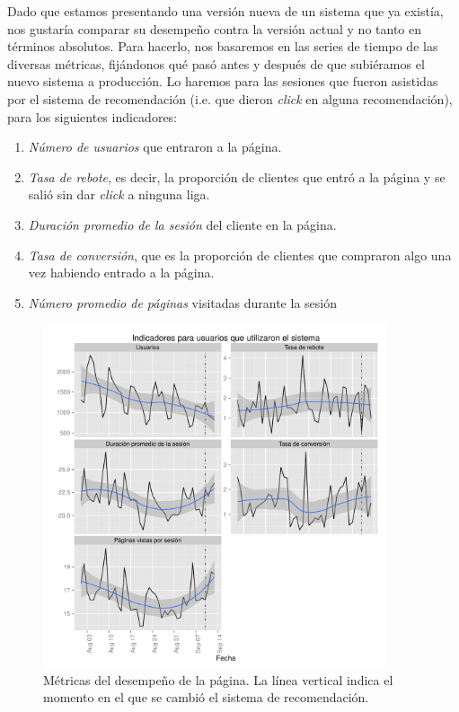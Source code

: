 \documentclass[12pt]{report}
\begin{document}
Dado que estamos presentando una versión nueva de un sistema que ya existía, nos gustaría comparar su desempeño contra la versión actual y no tanto en términos absolutos. Para hacerlo, nos basaremos en las series de tiempo de las diversas métricas, fijándonos qué pasó antes y después de que subiéramos el nuevo sistema a producción. Lo haremos para las sesiones que fueron asistidas por el sistema de recomendación (i.e. que dieron \emph{click} en alguna recomendación), para los siguientes indicadores:
\begin{enumerate}
	\item \emph{Número de usuarios} que entraron a la página.
	\item \emph{Tasa de rebote}, es decir, la proporción de clientes que entró a la página y se salió sin dar \emph{click} a ninguna liga.
	\item \emph{Duración promedio de la sesión} del cliente en la página.
	\item \emph{Tasa de conversión}, que es la proporción de clientes que compraron algo una vez habiendo entrado a la página.
	\item \emph{Número promedio de páginas} visitadas durante la sesión
\end{enumerate}

\begin{figure}[ht]
	\centering
	\includegraphics[width=0.9\textwidth]{imagenes/analytics_x.pdf}
	\caption{\label{fig:analytics_x} Métricas del desempeño de la página. La línea vertical indica el momento en el que se cambió el sistema de recomendación.}
\end{figure}
\end{document}
